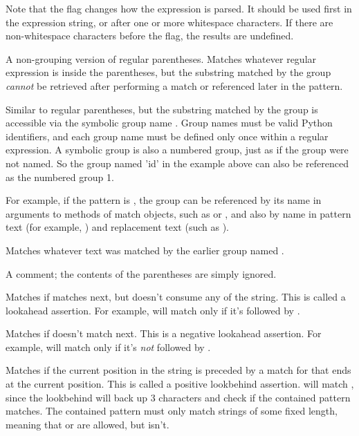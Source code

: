 \begin{list}{}{\leftmargin 0.7in }
Note that the  flag changes how the expression is parsed.
It should be used first in the expression string, or after one or more
whitespace characters.  If there are non-whitespace characters before
the flag, the results are undefined.

\item[\code{(?:...)}] A non-grouping version of regular parentheses.
Matches whatever regular expression is inside the parentheses, but the
substring matched by the
group \emph{cannot} be retrieved after performing a match or
referenced later in the pattern.

\item[\code{(?P<\var{name}>...)}] Similar to regular parentheses, but
the substring matched by the group is accessible via the symbolic group
name .  Group names must be valid Python identifiers, and
each group name must be defined only once within a regular expression.  A
symbolic group is also a numbered group, just as if the group were not
named.  So the group named 'id' in the example above can also be
referenced as the numbered group 1.

For example, if the pattern is
, the group can be referenced by its
name in arguments to methods of match objects, such as
 or , and also by name in
pattern text (for example, ) and replacement text
(such as ).

\item[\code{(?P=\var{name})}] Matches whatever text was matched by the
earlier group named .

\item[\code{(?\#...)}] A comment; the contents of the parentheses are
simply ignored.

\item[\code{(?=...)}] Matches if  matches next, but doesn't
consume any of the string.  This is called a lookahead assertion.  For
example,  will match  only if it's
followed by .

\item[\code{(?!...)}] Matches if  doesn't match next.  This
is a negative lookahead assertion.  For example,
 will match  only if it's \emph{not}
followed by .

\item[\code{(?<=...)}] Matches if the current position in the string
is preceded by a match for  that ends at the current
position.  This is called a positive lookbehind assertion.
 will match , since the lookbehind
will back up 3 characters and check if the contained pattern matches.
The contained pattern must only match strings of some fixed length,
meaning that  or  are allowed, but 
isn't.


\end{list}
